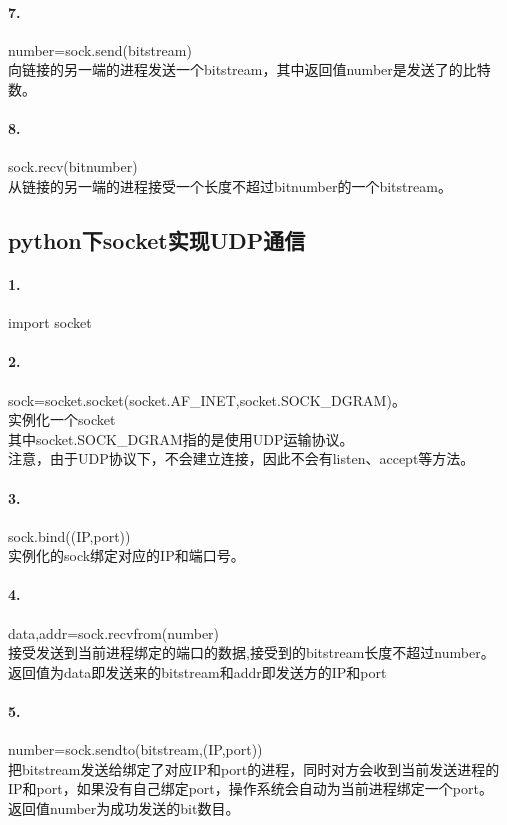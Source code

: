 \documentclass[12pt]{article}
\begin{document}
\begin{CJK}{UTF8}{gbsn}
\paragraph{7.}number=sock.send(bitstream)
\\向链接的另一端的进程发送一个bitstream，其中返回值number是发送了的比特数。
\paragraph{8.}sock.recv(bitnumber)
\\从链接的另一端的进程接受一个长度不超过bitnumber的一个bitstream。

\subsection{python下socket实现UDP通信}
\paragraph{1.}import socket
\paragraph{2.}sock=socket.socket(socket.AF\_INET,socket.SOCK\_DGRAM)。 \\实例化一个socket
\\其中socket.SOCK\_DGRAM指的是使用UDP运输协议。
\\注意，由于UDP协议下，不会建立连接，因此不会有listen、accept等方法。
\paragraph{3.}sock.bind((IP,port))
\\实例化的sock绑定对应的IP和端口号。
\paragraph{4.}data,addr=sock.recvfrom(number)
\\接受发送到当前进程绑定的端口的数据,接受到的bitstream长度不超过number。
\\返回值为data即发送来的bitstream和addr即发送方的IP和port
\paragraph{5.}number=sock.sendto(bitstream,(IP,port))
\\把bitstream发送给绑定了对应IP和port的进程，同时对方会收到当前发送进程的IP和port，如果没有自己绑定port，操作系统会自动为当前进程绑定一个port。
\\返回值number为成功发送的bit数目。


\end{CJK}
\end{document}
